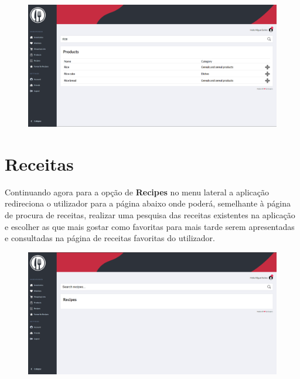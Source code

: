 \documentclass[a4paper]{report}
\begin{document}
    \begin{figure}[H]
        \centering
            \includegraphics[width=\textwidth]{images/produto_final/procura_de_produtos_efetuada.png}
    \end{figure}

    \section{Receitas}

    Continuando agora para a opção de \textbf{Recipes} no menu lateral a 
    aplicação redireciona o utilizador para a página abaixo onde poderá,
    semelhante à página de procura de receitas, realizar uma pesquisa
    das receitas existentes na aplicação e escolher as que mais gostar
    como favoritas para mais tarde serem apresentadas e consultadas na
    página de receitas favoritas do utilizador.

    \begin{figure}[H]
        \centering
            \includegraphics[width=\textwidth]{images/produto_final/procura_de_receitas.png}
    \end{figure}
\end{document}
